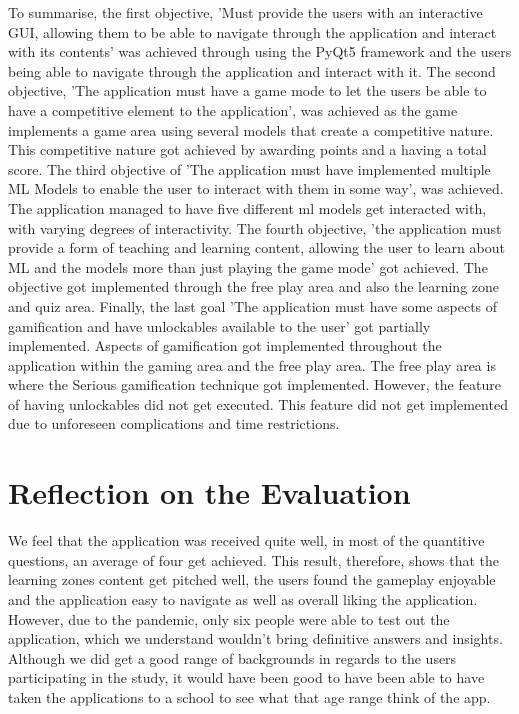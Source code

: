 		To summarise, the first objective, 'Must provide the users with an interactive GUI, allowing them to be able to navigate through the application and interact with its contents' was achieved through using the PyQt5 framework and the users being able to navigate through the application and interact with it. The second objective, 'The application must have a game mode to let the users be able to have a competitive element to the application', was achieved as the game implements a game area using several models that create a competitive nature. This competitive nature got achieved by awarding points and a having a total score. The third objective of 'The application must have implemented multiple ML Models to enable the user to interact with them in some way', was achieved. The application managed to have five different ml models get interacted with, with varying degrees of interactivity. The fourth objective, 'the application must provide a form of teaching and learning content, allowing the user to learn about ML and the models more than just playing the game mode' got achieved. The objective got implemented through the free play area and also the learning zone and quiz area. Finally, the last goal 'The application must have some aspects of gamification and have unlockables available to the user' got partially implemented. Aspects of gamification got implemented throughout the application within the gaming area and the free play area. The free play area is where the Serious gamification technique got implemented. However, the feature of having unlockables did not get executed. This feature did not get implemented due to unforeseen complications and time restrictions.

	\section{Reflection on the Evaluation}
		We feel that the application was received quite well, in most of the quantitive questions, an average of four get achieved. This result, therefore, shows that the learning zones content get pitched well, the users found the gameplay enjoyable and the application easy to navigate as well as overall liking the application. However, due to the pandemic, only six people were able to test out the application, which we understand wouldn't bring definitive answers and insights. Although we did get a good range of backgrounds in regards to the users participating in the study, it would have been good to have been able to have taken the applications to a school to see what that age range think of the app.
		
